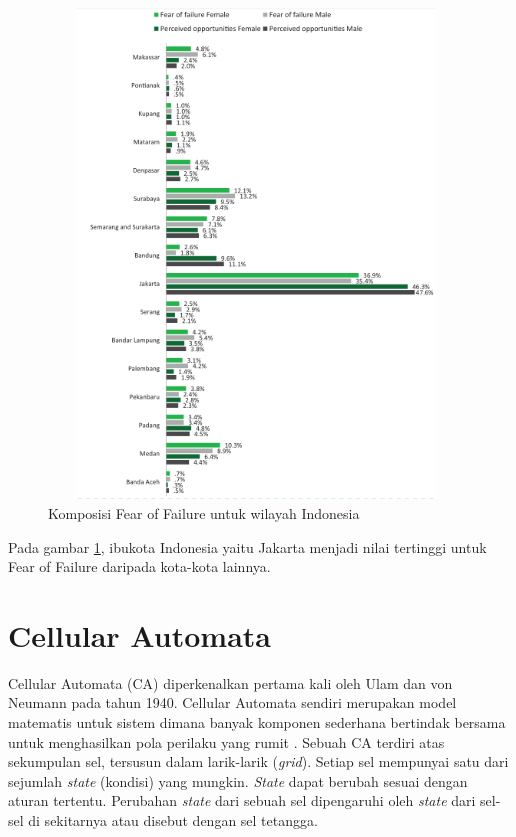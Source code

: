 \begin{figure} [H]
	\centering  
	\includegraphics[width=11cm, height=13cm]{lokasiFF2013} 
	\caption[Komposisi Fear of Failure untuk wilayah Indonesia]{Komposisi Fear of Failure untuk wilayah Indonesia} 
	\label{fig:lokasiFF} 
\end{figure} 

Pada gambar \ref{fig:lokasiFF}, ibukota Indonesia yaitu Jakarta menjadi nilai tertinggi untuk Fear of Failure daripada kota-kota lainnya.

\section{Cellular Automata}
\label{sec:cellularautomata}

Cellular Automata (CA) diperkenalkan pertama kali oleh Ulam dan von Neumann pada tahun 1940. Cellular Automata sendiri merupakan model matematis untuk sistem dimana banyak komponen sederhana bertindak bersama untuk menghasilkan pola perilaku yang rumit \cite{referensiCA2}. Sebuah CA terdiri atas sekumpulan sel, tersusun dalam larik-larik (\textit{grid}). Setiap sel mempunyai satu dari sejumlah \textit{state} (kondisi) yang mungkin. \textit{State} dapat berubah sesuai dengan aturan tertentu. Perubahan \textit{state} dari sebuah sel dipengaruhi oleh \textit{state} dari sel-sel di sekitarnya atau disebut dengan sel tetangga.

